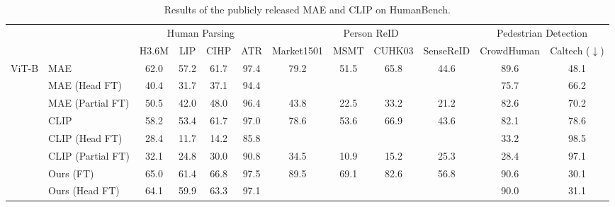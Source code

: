 \documentclass[10pt,twocolumn,letterpaper]{article}
\begin{document}
\begin{table*}[t]
  \scriptsize
  \centering
  \caption{Results of the publicly released MAE and CLIP on HumanBench.}
    \begin{tabular}{cl|cccccccccc}
    \toprule
          &       & \multicolumn{4}{c}{Human Parsing} & \multicolumn{4}{c}{Person ReID} & \multicolumn{2}{c}{Pedestrian  Detection} \\
\cmidrule{3-12}          &       & H3.6M & LIP   & CIHP  & \cellcolor[rgb]{ .949,  .949,  .949} ATR & Market1501 & MSMT  & CUHK03 & \cellcolor[rgb]{ .949,  .949,  .949} SenseReID & CrowdHuman & \cellcolor[rgb]{ .949,  .949,  .949} Caltech ($\downarrow$) \\
    \midrule
    \multirow{9}[6]{*}{ViT-B} & MAE   & 62.0  & 57.2  & 61.7  & \cellcolor[rgb]{ .949,  .949,  .949} 97.4  & 79.2  & 51.5  & 65.8  & \cellcolor[rgb]{ .949,  .949,  .949} 44.6  & 89.6  & \cellcolor[rgb]{ .949,  .949,  .949} 48.1  \\
          & MAE (Head FT) & 40.4  & 31.7  & 37.1  & \cellcolor[rgb]{ .949,  .949,  .949} 94.4  &    &    &    &    & 75.7  & \cellcolor[rgb]{ .949,  .949,  .949} 66.2  \\
          & MAE (Partial FT) & 50.5  & 42.0  & 48.0  & \cellcolor[rgb]{ .949,  .949,  .949} 96.4  & 43.8  & 22.5  & 33.2  & \cellcolor[rgb]{ .949,  .949,  .949} 21.2  & 82.6  & \cellcolor[rgb]{ .949,  .949,  .949} 70.2  \\
\cmidrule{2-12}          & CLIP  & 58.2  & 53.4  & 61.7  & \cellcolor[rgb]{ .949,  .949,  .949} 97.0  & 78.6  & 53.6  & 66.9  & \cellcolor[rgb]{ .949,  .949,  .949} 43.6  & 82.1  & \cellcolor[rgb]{ .949,  .949,  .949} 78.6  \\
          & CLIP (Head FT) & 28.4  & 11.7  & 14.2  & \cellcolor[rgb]{ .949,  .949,  .949} 85.8  &    &    &    &    & 33.2  & \cellcolor[rgb]{ .949,  .949,  .949} 98.5  \\
          & CLIP (Partial FT) & 32.1  & 24.8  & 30.0  & \cellcolor[rgb]{ .949,  .949,  .949} 90.8  & 34.5  & 10.9  & 15.2  & \cellcolor[rgb]{ .949,  .949,  .949}25.3  & 28.4  & \cellcolor[rgb]{ .949,  .949,  .949} 97.1  \\
\cmidrule{2-12}          & Ours (FT) & 65.0  & 61.4  & 66.8  & \cellcolor[rgb]{ .949,  .949,  .949} 97.5  & 89.5  & 69.1  & 82.6  & \cellcolor[rgb]{ .949,  .949,  .949} 56.8  & 90.6  & \cellcolor[rgb]{ .949,  .949,  .949} 30.1  \\
          & Ours (Head FT) & 64.1  & 59.9  & 63.3  & \cellcolor[rgb]{ .949,  .949,  .949} 97.1  &    &    &    & \cellcolor[rgb]{ .949,  .949,  .949}  & 90.0  & \cellcolor[rgb]{ .949,  .949,  .949} 31.1  \\

\end{tabular}
\end{table*}
\end{document}
